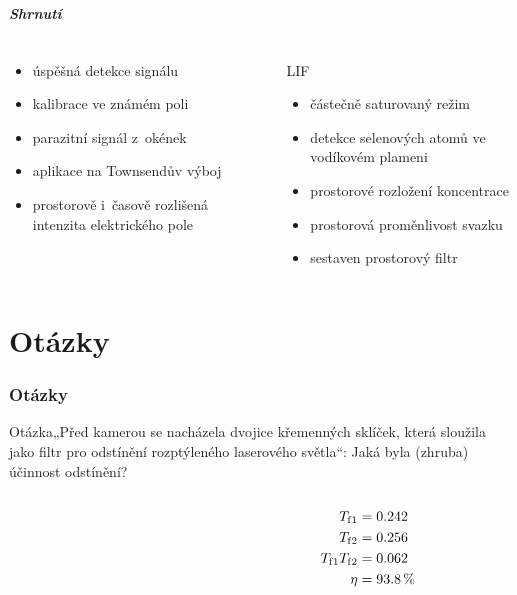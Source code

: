 \documentclass[10pt]{beamer}
\begin{document}
\begin{frame}
	\frametitle{Shrnutí}
	\begin{columns}[t]
	\begin{column}{0.5\textwidth}
		\EFISH
		\begin{itemize}
			\item úspěšná detekce signálu
			\item kalibrace ve známém poli
			\item parazitní signál z~okének
			\item aplikace na Townsendův výboj
			\item prostorově i~časově rozlišená intenzita elektrického pole
		\end{itemize}
	\end{column}
	\begin{column}{0.5\textwidth}
		LIF
		\begin{itemize}
			\item částečně saturovaný režim
			\item detekce selenových atomů ve vodíkovém plameni
			\item prostorové rozložení koncentrace 
			\item prostorová proměnlivost svazku
			\item sestaven prostorový filtr
		\end{itemize}
	\end{column}
	\end{columns}
\end{frame}

\part{Otázky}
\section{Otázky}
\newcommand\question[1]{\begin{block}{Otázka}#1\end{block}\pause}
\begin{frame}
	\partpage
\end{frame}

\begin{frame}
	\question{„Před kamerou se nacházela dvojice křemenných sklíček, která
		sloužila jako filtr pro odstínění rozptýleného laserového světla“:
		Jaká byla (zhruba) účinnost odstínění?}
	\begin{columns}
	\begin{column}{0.75\textwidth}
		
	\end{column}
	\begin{column}{0.25\textwidth}
		\begin{align*}
			T_\text{f}{}_1 &= \num{0.242} \\
			T_\text{f}{}_2 &= \num{0.256} \\
			T_\text{f}{}_1 T_\text{f}{}_2 &= \num{0.062} \\
			\eta &= \SI{93.8}{\percent}
		\end{align*}
	\end{column}
	\end{columns}
\end{frame}
\end{document}
